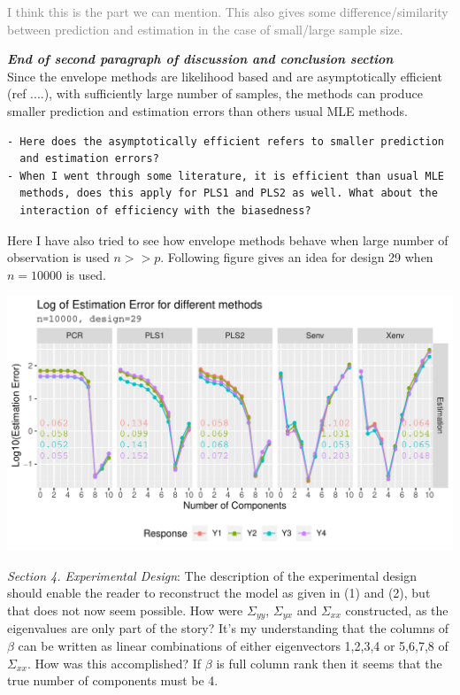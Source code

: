 \documentclass[12pt, a4paper]{scrartcl}
\begin{document}
\textcolor{gray}{I think this is the part we can mention. This also gives some difference/similarity between prediction and estimation in the case of small/large sample size.}

\textcolor{critical}{
\textbf{\textcolor{mycolor1}{\textit{End of second paragraph of discussion and conclusion section}}} \hfill\\
Since the envelope methods are likelihood based and are asymptotically efficient (ref ....), with sufficiently large number of samples, the methods can produce smaller prediction and estimation errors than others usual MLE methods.}
\begin{verbatim}
- Here does the asymptotically efficient refers to smaller prediction 
  and estimation errors?
- When I went through some literature, it is efficient than usual MLE 
  methods, does this apply for PLS1 and PLS2 as well. What about the 
  interaction of efficiency with the biasedness?
\end{verbatim}

\textcolor{answers}{Here I have also tried to see how envelope methods behave when large number of observation is used $n>>p$. Following figure gives an idea for design 29 when $n=10000$ is used.}

\includegraphics[width=\textwidth]{large-n-est-error.pdf}

\textit{Section 4. Experimental Design}: The description of the experimental design should enable
the reader to reconstruct the model as given in (1) and (2), but that does not now seem
possible. How were $\Sigma_{yy}$, $\Sigma_{yx}$ and $\Sigma_{xx}$ constructed, as the eigenvalues are only part of the story? It’s my understanding that the columns of $\beta$ can be written as linear combinations of either eigenvectors 1,2,3,4 or 5,6,7,8 of $\Sigma_{xx}$. How was this accomplished? If $\beta$ is full column rank then it seems that the true number of components must be 4.
\end{document}
